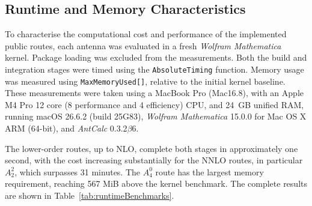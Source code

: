 \subsection{Runtime and Memory Characteristics}

To characterise the computational cost and performance of the implemented public 
routes, each antenna was evaluated in a fresh \textit{Wolfram Mathematica} kernel. 
Package loading was excluded from the measurements. Both the build 
and integration stages were timed using the \texttt{AbsoluteTiming} function. 
Memory usage was measured using \texttt{MaxMemoryUsed[]}, relative to the 
initial kernel baseline. These measurements were taken using a MacBook Pro (Mac16.8), 
with an Apple M4 Pro 12 core (8 performance and 4 efficiency) CPU, and 24~GB unified 
RAM, running macOS 26.6.2 (build 25G83), \textit{Wolfram Mathematica} 15.0.0 for Mac 
OS X ARM (64-bit), and \textit{AntCalc} 0.3.2$\beta$6.

The lower-order routes, up to NLO, complete both stages in approximately one second,
with the cost increasing substantially for the NNLO routes, in particular $A_2^2$, 
which surpasses 31 minutes. The $A_4^0$ route has the largest memory requirement, 
reaching 567 MiB above the kernel benchmark. The complete results are shown in 
Table~\ref{tab:runtimeBenchmarks}.

